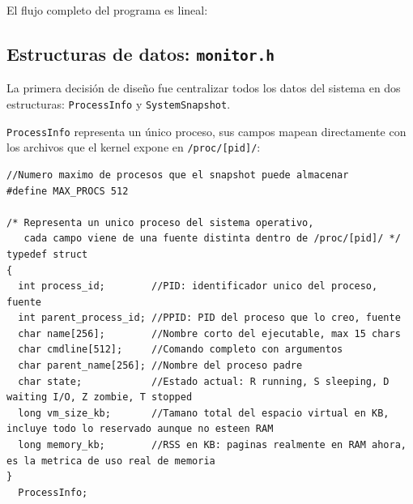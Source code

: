 \documentclass[12pt,letterpaper]{article}
\begin{document}
El flujo completo del programa es lineal:
\begin{center}
\end{center}

\subsection*{Estructuras de datos: \texttt{monitor.h}}
La primera decisión de diseño fue centralizar todos los datos del sistema en dos estructuras:
\texttt{ProcessInfo} y \texttt{SystemSnapshot}.

\medskip

\texttt{ProcessInfo} representa un único proceso, sus campos mapean directamente con los archivos que el kernel
expone en \texttt{/proc/[pid]/}:

\begin{lstlisting}[style=modernc, caption={\texttt{monitor.h} struct ProcessInfo (líneas 12--21)}]
//Numero maximo de procesos que el snapshot puede almacenar
#define MAX_PROCS 512

/* Representa un unico proceso del sistema operativo,
   cada campo viene de una fuente distinta dentro de /proc/[pid]/ */
typedef struct
{
  int process_id;        //PID: identificador unico del proceso, fuente
  int parent_process_id; //PPID: PID del proceso que lo creo, fuente
  char name[256];        //Nombre corto del ejecutable, max 15 chars
  char cmdline[512];     //Comando completo con argumentos
  char parent_name[256]; //Nombre del proceso padre
  char state;            //Estado actual: R running, S sleeping, D waiting I/O, Z zombie, T stopped
  long vm_size_kb;       //Tamano total del espacio virtual en KB, incluye todo lo reservado aunque no esteen RAM
  long memory_kb;        //RSS en KB: paginas realmente en RAM ahora,  es la metrica de uso real de memoria
}
  ProcessInfo;
\end{lstlisting}
\end{document}
